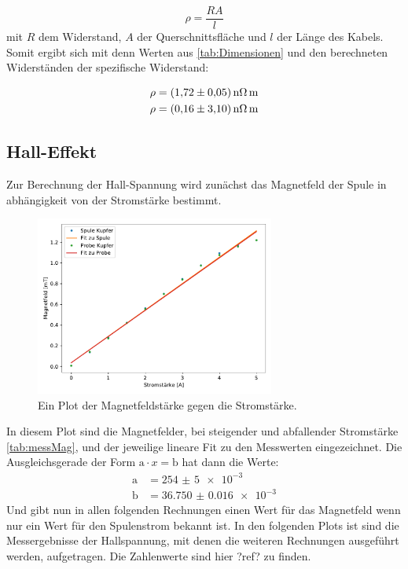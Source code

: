     \begin{equation}
        \rho = \frac{RA}{l}
    \end{equation}
    \noindent
    mit $R$ dem Widerstand, $A$ der Querschnittsfläche und $l$ der Länge des Kabels.
    Somit ergibt sich mit denn Werten aus \ref{tab:Dimensionen} und den berechneten Widerständen der spezifische Widerstand:

    \begin{align}
        \rho &= \SI{1.72+-0.05}{\nano\ohm\meter}\\
        \rho &= \SI{0.16+-03.1}{\nano\ohm\meter}
    \end{align}

    \subsection{Hall-Effekt}
    Zur Berechnung der Hall-Spannung wird zunächst das Magnetfeld der Spule in abhängigkeit von der Stromstärke bestimmt.

    \begin{figure}[H]
        \centering
        \includegraphics[width=0.7\textwidth]{build/Magnetfeld.pdf}
        \caption{Ein Plot der Magnetfeldstärke gegen die Stromstärke.}
        \label{img:Magnetfeld}
    \end{figure}
    \noindent
    In diesem Plot sind die Magnetfelder, bei steigender und abfallender Stromstärke \ref{tab:messMag}, und der jeweilige lineare Fit zu den 
    Messwerten eingezeichnet.
    Die Ausgleichsgerade der Form $\text{a}\cdot x = \text{b}$ hat dann die Werte:
    \begin{align}
        \text{a} & = \num{254(5)e-3}\\
        \text{b} & = \num{36.750(16)e-3}
    \end{align}
    Und gibt nun in allen folgenden Rechnungen einen Wert für das Magnetfeld wenn nur ein Wert für den Spulenstrom bekannt ist.
    \noindent
    In den folgenden Plots ist sind die Messergebnisse der Hallspannung, mit denen die weiteren Rechnungen ausgeführt werden, aufgetragen.
    Die Zahlenwerte sind hier ?ref? zu finden.

